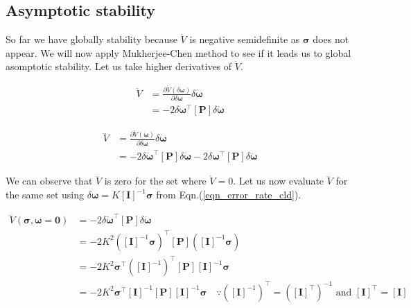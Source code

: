 \documentclass{article}
\begin{document}
\subsection{Asymptotic stability}
So far we have globally stability  because $\dot{V}$ is negative semidefinite as $\bm{\sigma}$ does not appear. We will now apply Mukherjee-Chen method to see if it leads us to global asomptotic stability. Let us take higher derivatives of $\dot{V}$.

\begin{equation*}
  \begin{split}
    \ddot{V}&=\frac{\partial \dot{V}(\delta\bm{\omega})}{\partial\delta\bm{\omega}}\delta\dot{\bm{\omega}}\\
    &=-2\delta\bm{\omega}^{\intercal}[\bm{P}]\delta\dot{\bm{\omega}}
  \end{split}  
\end{equation*}


\begin{equation*}
  \begin{split}
    \dddot{V}&=\frac{\partial \ddot{V}(\dot{\bm{\omega}})}{\partial\delta\bm{\omega}}\delta\dot{\bm{\omega}}\\
    &=-2\delta\dot{\bm{\omega}}^{\intercal}[\bm{P}]\delta\dot{\bm{\omega}}-2\delta\bm{\omega}^{\intercal}[\bm{P}]\delta\ddot{\bm{\omega}}
  \end{split}  
\end{equation*}

We can observe that $\ddot{V}$ is zero for the set where $\dot{V}=0$. Let us now evaluate $\dddot{V}$ for the same set using $\delta\bm{\omega}=K[\bm{I}]^{-1}\bm{\sigma}$ from Eqn.(\ref{eqn_error_rate_cld}).

\begin{equation*}
  \begin{split}
    \dddot{V}(\bm{\sigma},\bm{\omega}=\bm{0})&=-2\delta\dot{\bm{\omega}}^{\intercal}[\bm{P}]\delta\dot{\bm{\omega}}\\
    &=-2K^{2}([\bm{I}]^{-1}\bm{\sigma})^{\intercal}[\bm{P}]([\bm{I}]^{-1}\bm{\sigma})\\
    &=-2K^{2}\bm{\sigma}^{\intercal}([\bm{I}]^{-1})^{\intercal}[\bm{P}][\bm{I}]^{-1}\bm{\sigma}\\
    &=-2K^{2}\bm{\sigma}^{\intercal}[\bm{I}]^{-1}[\bm{P}][\bm{I}]^{-1}\bm{\sigma}\quad\because([\bm{I}]^{-1})^{\intercal}=([\bm{I}]^{\intercal})^{-1}\text{ and }[\bm{I}]^{\intercal}=[\bm{I}]\\
  \end{split}
\end{equation*}
\end{document}
